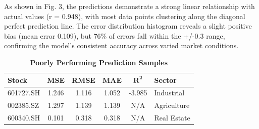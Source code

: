 \documentclass[3p,times,procedia]{elsarticle}
\begin{document}
As shown in Fig. 3, the predictions demonstrate a strong linear relationship with actual values (r = 0.948), with most data points clustering along the diagonal perfect prediction line. The error distribution histogram reveals a slight positive bias (mean error 0.109), but 76\% of errors fall within the +/-0.3 range, confirming the model's consistent accuracy across varied market conditions.



\begin{table}[!ht]\footnotesize
\renewcommand{\arraystretch}{1.1}
\centering
\caption{\textbf{Poorly Performing Prediction Samples}}
\begin{tabular}{|l|c|c|c|c|l|}
\hline
\textbf{Stock} & \textbf{MSE} & \textbf{RMSE} & \textbf{MAE} & \textbf{$\mathbf{R^2}$} & \textbf{Sector} \\
\hline
601727.SH & 1.246 & 1.116 & 1.052 & -3.985 & Industrial \\
002385.SZ & 1.297 & 1.139 & 1.139 & N/A    & Agriculture \\
600340.SH & 0.101 & 0.318 & 0.318 & N/A    & Real Estate \\
\hline
\end{tabular}
\end{table}

\end{document}
